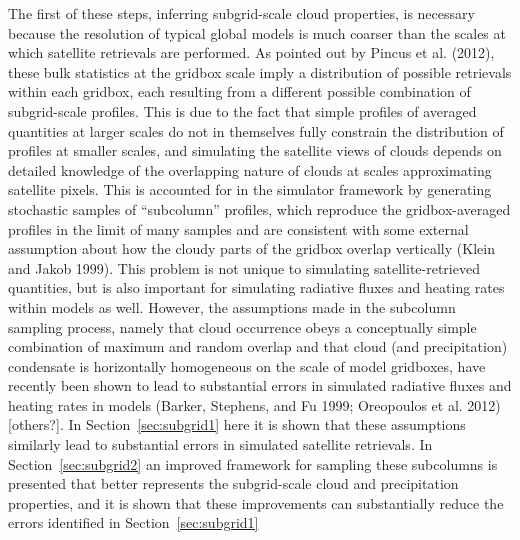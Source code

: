 The first of these steps, inferring subgrid-scale cloud properties, is
necessary because the resolution of typical global models is much
coarser than the scales at which satellite retrievals are performed. As
pointed out by Pincus et al. (2012), these bulk statistics at the
gridbox scale imply a distribution of possible retrievals within each
gridbox, each resulting from a different possible combination of
subgrid-scale profiles. This is due to the fact that simple profiles of
averaged quantities at larger scales do not in themselves fully
constrain the distribution of profiles at smaller scales, and simulating
the satellite views of clouds depends on detailed knowledge of the
overlapping nature of clouds at scales approximating satellite pixels.
This is accounted for in the simulator framework by generating
stochastic samples of ``subcolumn'' profiles, which reproduce the
gridbox-averaged profiles in the limit of many samples and are
consistent with some external assumption about how the cloudy parts of
the gridbox overlap vertically (Klein and Jakob 1999). This problem is
not unique to simulating satellite-retrieved quantities, but is also
important for simulating radiative fluxes and heating rates within
models as well. However, the assumptions made in the subcolumn sampling
process, namely that cloud occurrence obeys a conceptually simple
combination of maximum and random overlap and that cloud (and
precipitation) condensate is horizontally homogeneous on the scale of
model gridboxes, have recently been shown to lead to substantial errors
in simulated radiative fluxes and heating rates in models (Barker,
Stephens, and Fu 1999; Oreopoulos et al. 2012) {[}others?{]}. In
Section~\ref{sec:subgrid1} here it is shown that these assumptions
similarly lead to substantial errors in simulated satellite retrievals.
In Section~\ref{sec:subgrid2} an improved framework for sampling these
subcolumns is presented that better represents the subgrid-scale cloud
and precipitation properties, and it is shown that these improvements
can substantially reduce the errors identified in
Section~\ref{sec:subgrid1}

